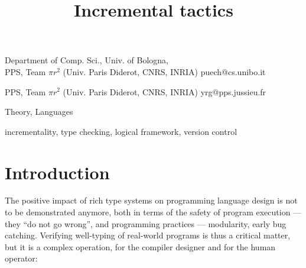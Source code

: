 \documentclass[9pt]{sigplanconf}
\begin{document}
\copyrightdata{[to be supplied]}


\title{Incremental tactics}

           {Department of Comp. Sci., Univ. of Bologna,\\
             PPS, Team $\pi r^2$ (Univ. Paris Diderot, CNRS, INRIA)}
           {puech@cs.unibo.it}

           {PPS, Team $\pi r^2$ (Univ. Paris Diderot, CNRS, INRIA)}
           {yrg@pps.jussieu.fr}

\maketitle

\begin{abstract}
\end{abstract}

 

\terms
Theory, Languages

\keywords
incrementality, type checking, logical framework, version control


\section*{Introduction}


The positive impact of rich type systems on programming language
design is not to be demonstrated anymore, both in terms of the safety
of program execution --- they ``do not go wrong'', and programming
practices --- modularity, early bug catching. Verifying well-typing of
real-world programs is thus a critical matter, but it is a complex
operation, for the compiler designer and for the human operator:
\end{document}
